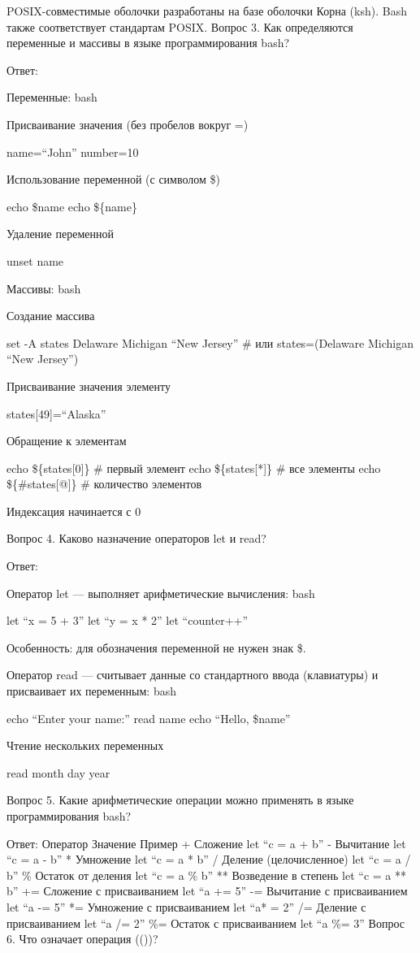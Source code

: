 \documentclass[
  letterpaper,
  DIV=11,
  numbers=noendperiod]{scrartcl}
\begin{document}
POSIX-совместимые оболочки разработаны на базе оболочки Корна (ksh).
Bash также соответствует стандартам POSIX. Вопрос 3. Как определяются
переменные и массивы в языке программирования bash?

Ответ:

Переменные: bash

Присваивание значения (без пробелов вокруг =)

name=``John'' number=10

Использование переменной (с символом \$)

echo \$name echo \$\{name\}

Удаление переменной

unset name

Массивы: bash

Создание массива

set -A states Delaware Michigan ``New Jersey'' \# или states=(Delaware
Michigan ``New Jersey'')

Присваивание значения элементу

states{[}49{]}=``Alaska''

Обращение к элементам

echo \$\{states{[}0{]}\} \# первый элемент echo \$\{states{[}*{]}\} \#
все элементы echo \$\{\#states{[}@{]}\} \# количество элементов

Индексация начинается с 0

Вопрос 4. Каково назначение операторов let и read?

Ответ:

Оператор let --- выполняет арифметические вычисления: bash

let ``x = 5 + 3'' let ``y = x * 2'' let ``counter++''

Особенность: для обозначения переменной не нужен знак \$.

Оператор read --- считывает данные со стандартного ввода (клавиатуры) и
присваивает их переменным: bash

echo ``Enter your name:'' read name echo ``Hello, \$name''

Чтение нескольких переменных

read month day year

Вопрос 5. Какие арифметические операции можно применять в языке
программирования bash?

Ответ: Оператор Значение Пример + Сложение let ``c = a + b'' - Вычитание
let ``c = a - b'' * Умножение let ``c = a * b'' / Деление
(целочисленное) let ``c = a / b'' \% Остаток от деления let ``c = a \%
b'' ** Возведение в степень let ``c = a ** b'' += Сложение с
присваиванием let ``a += 5'' -= Вычитание с присваиванием let ``a -= 5''
*= Умножение с присваиванием let ``a* = 2'' /= Деление с присваиванием
let ``a /= 2'' \%= Остаток с присваиванием let ``a \%= 3'' Вопрос 6. Что
означает операция (())?
\end{document}
